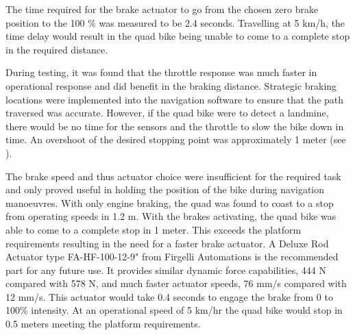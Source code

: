 \documentclass[main.tex]{subfiles}
\begin{document}
The time required for the brake actuator to go from the chosen zero brake position to the 100 \% was measured to be 2.4 seconds. Travelling at 5 km/h, the time delay would result in the quad bike being unable to come to a complete stop in the required distance.

During testing, it was found that the throttle response was much faster in operational response and did benefit in the braking distance. Strategic braking locations were implemented into the navigation software to ensure that the path traversed was accurate. However, if the quad bike were to detect a landmine, there would be no time for the sensors and the throttle to slow the bike down in time. An overshoot of the desired stopping point was approximately 1 meter (see ).

The brake speed and thus actuator choice were insufficient for the required task and only proved useful in holding the position of the bike during navigation manoeuvres. With only engine braking, the quad was found to coast to a stop from operating speeds in 1.2 m. With the brakes activating, the quad bike was able to come to a complete stop in 1 meter. This exceeds the platform requirements resulting in the need for a faster brake actuator. A Deluxe Rod Actuator type FA-HF-100-12-9" from Firgelli Automations is the recommended part for any future use. It provides similar dynamic force capabilities, 444 N compared with 578 N, and much faster actuator speeds, 76 mm/s compared with 12 mm/s. This actuator would take 0.4 seconds to engage the brake from 0 to 100\% intensity. At an operational speed of 5 km/hr the quad bike would stop in 0.5 meters meeting the platform requirements.
\end{document}
